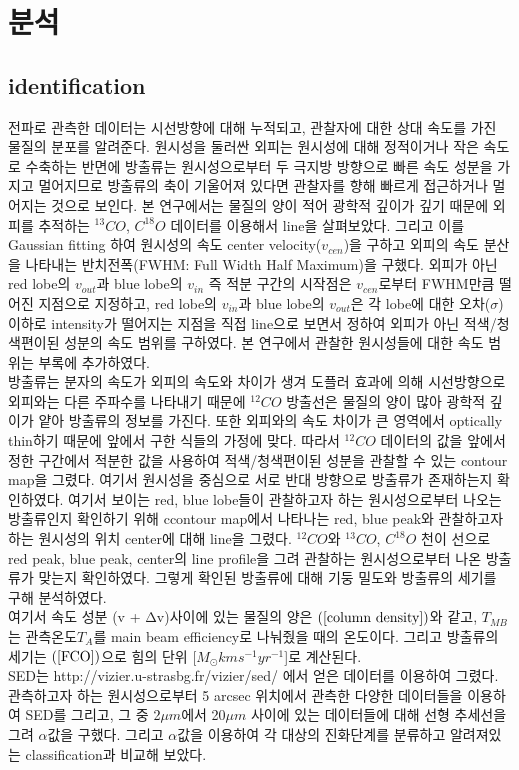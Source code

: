 

\section{분석}

\subsection{identification}

전파로 관측한 데이터는 시선방향에 대해 누적되고, 관찰자에 대한 상대 속도를 가진 물질의 분포를 알려준다. 원시성을 둘러싼 외피는 원시성에 대해 정적이거나 작은 속도로 수축하는 반면에 방출류는 원시성으로부터 두 극지방 방향으로 빠른 속도 성분을 가지고 멀어지므로 방출류의 축이 기울어져 있다면 관찰자를 향해 빠르게 접근하거나 멀어지는 것으로 보인다. 본 연구에서는 물질의 양이 적어 광학적 깊이가 깊기 때문에 외피를 추적하는 $^{13}CO$, $C^{18}O$ 데이터를 이용해서 line을 살펴보았다. 그리고 이를 Gaussian fitting 하여 원시성의 속도 center velocity($v_{cen}$)을 구하고 외피의 속도 분산을 나타내는 반치전폭(FWHM: Full Width Half Maximum)을 구했다. 외피가 아닌 red lobe의 $v_{out}$과 blue lobe의 $v_{in}$ 즉 적분 구간의 시작점은 $v_{cen}$로부터 FWHM만큼 떨어진 지점으로 지정하고, red lobe의 $v_{in}$과 blue lobe의 $v_{out}$은 각 lobe에 대한 오차($\sigma$)이하로 intensity가 떨어지는 지점을 직접 line으로 보면서 정하여 외피가 아닌 적색/청색편이된 성분의 속도 범위를 구하였다. 본 연구에서 관찰한 원시성들에 대한 속도 범위는 부록에 추가하였다.\\
방출류는 분자의 속도가 외피의 속도와 차이가 생겨 도플러 효과에 의해 시선방향으로 외피와는 다른 
주파수를 나타내기 때문에 $^{12}CO$ 방출선은 물질의 양이 많아 광학적 깊이가 얕아 방출류의 정보를 가진다. 또한 외피와의 속도 차이가 큰 영역에서 optically thin하기 때문에 앞에서 구한 식들의 가정에 맞다. 따라서 $^{12}CO$ 데이터의 값을 앞에서 정한 구간에서 적분한 값을 사용하여 적색/청색편이된 성분을 관찰할 수 있는 contour map을 그렸다. 여기서 원시성을 중심으로 서로 반대 방향으로 방출류가 존재하는지 확인하였다. 여기서 보이는 red, blue lobe들이 관찰하고자 하는 원시성으로부터 나오는 방출류인지 확인하기 위해 ccontour map에서 나타나는 red, blue peak와 관찰하고자 하는 원시성의 위치 center에 대해 line을 그렸다. $^{12}CO$와 $^{13}CO$, $C^{18}O$ 천이 선으로 red peak, blue peak, center의 line profile을 그려 관찰하는 원시성으로부터 나온 방출류가 맞는지 확인하였다. 그렇게 확인된 방출류에 대해 기둥 밀도와 방출류의 세기를 구해 분석하였다.\\
여기서 속도 성분 (v + Δv)사이에 있는 물질의 양은 $(\ref{column density})$와 같고, $T_{MB}$는 관측온도$T_A$를 main beam efficiency로 나눠줬을 때의 온도이다. 그리고 방출류의 세기는 $(\ref{FCO})$으로 힘의 단위 [$M_{\odot} km s^{-1} yr^{-1}$]로 계산된다.\cite{Hatchell2}
\\
SED는 http://vizier.u-strasbg.fr/vizier/sed/ 에서 얻은 데이터를 이용하여 그렸다. 관측하고자 하는 원시성으로부터 5 arcsec 위치에서 관측한 다양한 데이터들을 이용하여 SED를 그리고, 그 중 2$\mu m $에서 20$\mu m$ 사이에 있는 데이터들에 대해 선형 추세선을 그려 $\alpha$값을 구했다. 그리고 $\alpha$값을 이용하여 각 대상의 진화단계를 분류하고 알려져있는 classification과 비교해 보았다. 


